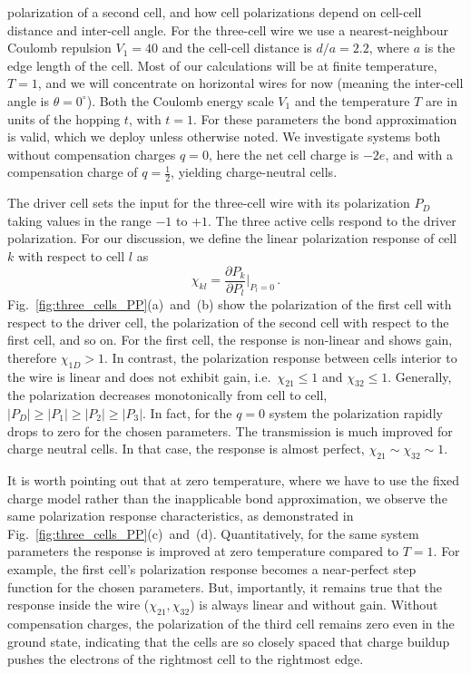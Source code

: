 polarization of a second cell, and how cell polarizations depend on cell-cell
distance and inter-cell angle. For the three-cell wire we use a
nearest-neighbour Coulomb repulsion $V_1 = 40$ and the cell-cell distance is
$d/a = 2.2$, where $a$ is the edge length of the cell. Most of our calculations
will be at finite temperature, $T = 1$, and we will concentrate on horizontal
wires for now (meaning the inter-cell angle is $\theta = 0^{\circ}$). Both the
Coulomb energy scale $V_1$ and the temperature $T$ are in units of the hopping $t$,
with $t = 1$. For these parameters the bond approximation is valid, which we
deploy unless otherwise noted. We investigate systems both without compensation
charges $q = 0$, here the net cell charge is $-2e$, and with a compensation
charge of $q=\frac{1}{2}$, yielding charge-neutral cells.

The driver cell sets the input for the three-cell wire with its
polarization $P_D$ taking values in the range $-1$ to $+1$. The three active
cells respond to the driver polarization. For our discussion, we define the
linear polarization response of cell $k$ with respect to cell $l$ as
%
\begin{equation}
  \label{eq:polarization_response}
  \chi_{kl} = \frac{\partial P_k}{\partial P_l}\big|_{P_l = 0} \, .
\end{equation}
%
Fig.~\ref{fig:three_cells_PP}(a)~and~(b) show the polarization of the first cell
with respect to the driver cell, the polarization of the second cell with
respect to the first cell, and so on. For the first cell, the response is
non-linear and shows gain, therefore $\chi_{1D} > 1$. In contrast, the
polarization response between cells interior to the wire is linear and does not
exhibit gain, i.e.\ $\chi_{21} \le 1$ and $\chi_{32} \le 1$. Generally, the
polarization decreases monotonically from cell to cell, $|P_D| \ge |P_1| \ge
|P_2| \ge |P_3|$. In fact, for the $q=0$ system the polarization rapidly drops
to zero for the chosen parameters. The transmission is much improved for charge
neutral cells. In that case, the response is almost perfect, $\chi_{21} \sim
\chi_{32} \sim 1$.

It is worth pointing out that at zero temperature, where we have to use the
fixed charge model rather than the inapplicable bond approximation, we observe
the same polarization response characteristics, as demonstrated in
Fig.~\ref{fig:three_cells_PP}(c)~and~(d). Quantitatively, for the same system
parameters the response is improved at zero temperature compared to $T=1$. For
example, the first cell's polarization response becomes a near-perfect step
function for the chosen parameters. But, importantly, it remains true that the
response inside the wire ($\chi_{21}, \chi_{32}$) is always linear and without
gain. Without compensation charges, the polarization of the third cell remains
zero even in the ground state, indicating that the cells are so closely spaced
that charge buildup pushes the electrons of the rightmost cell to the rightmost
edge.

